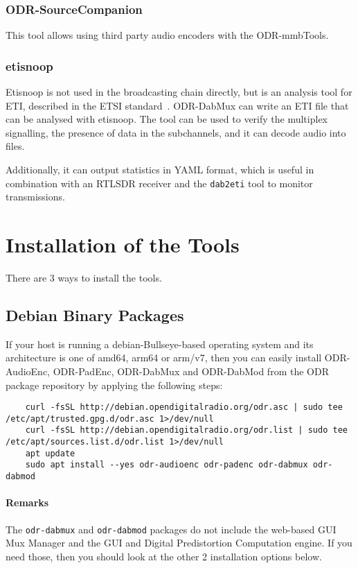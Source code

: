 \subsubsection{ODR-SourceCompanion}
This tool allows using third party audio encoders with the ODR-mmbTools.

\subsubsection{etisnoop}
Etisnoop is not used in the broadcasting chain directly, but is an analysis tool
for ETI, described in the ETSI standard~\cite{etsidabeti}. ODR-DabMux can write
an ETI file that can be analysed with etisnoop. The tool can be used to verify
the multiplex signalling, the presence of data in the subchannels, and it can
decode audio into files.

Additionally, it can output statistics in YAML format, which is useful in
combination with an RTLSDR receiver and the \verb+dab2eti+ tool to monitor
transmissions.

\section{Installation of the Tools}
There are 3 ways to install the tools.

\subsection{Debian Binary Packages}
If your host is running a debian-Bullseye-based operating system and its
architecture is one of amd64, arm64 or arm/v7, then you can easily install
ODR-AudioEnc, ODR-PadEnc, ODR-DabMux and ODR-DabMod
from the ODR package repository by applying the following steps:

\begin{lstlisting}
    curl -fsSL http://debian.opendigitalradio.org/odr.asc | sudo tee /etc/apt/trusted.gpg.d/odr.asc 1>/dev/null
    curl -fsSL http://debian.opendigitalradio.org/odr.list | sudo tee /etc/apt/sources.list.d/odr.list 1>/dev/null
    apt update
    sudo apt install --yes odr-audioenc odr-padenc odr-dabmux odr-dabmod
\end{lstlisting}

\paragraph{Remarks}
The \texttt{odr-dabmux} and \texttt{odr-dabmod} packages do not include the web-based GUI Mux Manager
and the GUI and Digital Predistortion Computation engine. If you need those, then you
should look at the other 2 installation options below.

